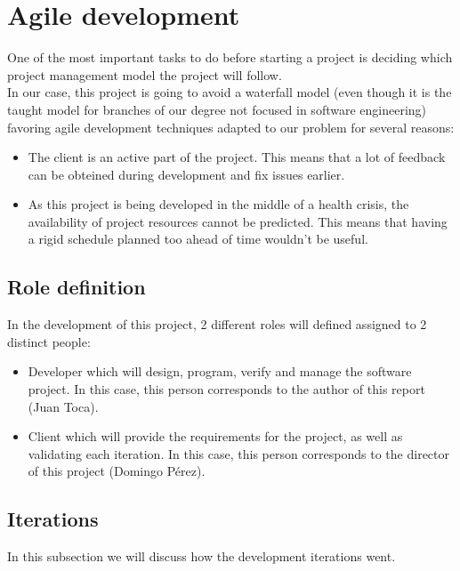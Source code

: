 \section{Agile development}

    One of the most important tasks to do before starting a project is deciding
    which project management model the project will follow.\\

    In our case, this project is going to avoid a waterfall model
    (even though it is the taught model for branches of our degree not focused
    in software engineering) favoring agile development techniques adapted to
    our problem for several reasons:
    \begin{itemize}
      \item The client is an active part of the project. This means that
      a lot of feedback can be obteined during development and fix issues earlier.
      \item As this project is being developed in the middle of a health crisis,
      the availability of project resources cannot be predicted. This means
      that having a rigid schedule planned too ahead of time wouldn't be
      useful.
    \end{itemize}

    \subsection{Role definition}

    In the development of this project, 2 different roles will defined
    assigned to 2 distinct people:
    \begin{itemize}
      \item Developer which will design, program, verify and manage the
      software project. In this case, this person corresponds to the author of
      this report (Juan Toca).
      \item Client which will provide the requirements for the project, as well
      as validating each iteration. In this case, this person corresponds to
      the director of this project (Domingo Pérez).
    \end{itemize}

    \subsection{Iterations}

      In this subsection we will discuss how the development iterations went.\\

